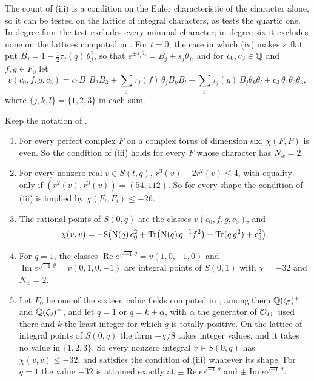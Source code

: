 The count of (iii) is a condition on the Euler
characteristic of the character alone, so it can be tested on the lattice of
integral characters, as  tests the quartic one. In
degree four the test excludes every minimal character; in degree six it
excludes none on the lattices computed in . For
$t=0$, the case in which
(iv) makes $\kappa$ flat, put
$B_{j}=1-\tfrac12\tau_{j}(q)\,\theta_{j}^{2}$, so that
$e^{\pm s_{j}\theta_{j}}=B_{j}\pm s_{j}\theta_{j}$, and for
$c_{0},c_{3}\in\mathbb{Q}$ and $f,g\in F_{0}$ let
\[
  v(c_{0},f,g,c_{3})=c_{0}B_{1}B_{2}B_{3}
  +\sum_{j}\tau_{j}(f)\,\theta_{j}B_{k}B_{l}
  +\sum_{j}\tau_{j}(g)\,B_{j}\theta_{k}\theta_{l}
  +c_{3}\,\theta_{1}\theta_{2}\theta_{3},
\]
where $\{j,k,l\}=\{1,2,3\}$ in each sum.

\begin{proposition}
\label{prop:sexticintegral}
Keep the notation of .
\begin{enumerate}[label=\textup{(\roman*)},leftmargin=2.6em,itemsep=2pt]
\item For every perfect complex $F$ on a complex torus of dimension six,
  $\chi(F,F)$ is even. So the condition of (iii)
  holds for every $F$ whose character has $N_{w}=2$.
\item For every nonzero real $v\in S(t,q)$, $r^{3}(v)-2r^{2}(v)\le4$, with
  equality only if $(r^{2}(v),r^{3}(v))=(54,112)$. So for every shape the
  condition of (iii) is implied by
  $\chi(F_{i},F_{i})\le-26$.
\item The rational points of $S(0,q)$ are the classes $v(c_{0},f,g,c_{3})$,
  and
  \[
    \chi(v,v)=-8\bigl(\mathrm{N}(q)\,c_{0}^{2}+\operatorname{Tr}\bigl(\mathrm{N}(q)\,q^{-1}f^{2}\bigr)
    +\operatorname{Tr}(q\,g^{2})+c_{3}^{2}\bigr).
  \]
\item For $q=1$, the classes $\operatorname{Re}e^{\sqrt{-1}\,\theta}=v(1,0,-1,0)$
  and $\operatorname{Im}e^{\sqrt{-1}\,\theta}=v(0,1,0,-1)$ are integral
  points of $S(0,1)$ with $\chi=-32$ and $N_{w}=2$.
\item Let $F_{0}$ be one of the sixteen cubic fields computed in \cite{BMB26}, among them $\mathbb{Q}(\zeta_{7})^{+}$ and
  $\mathbb{Q}(\zeta_{9})^{+}$, and let $q=1$ or $q=k+\alpha$, with $\alpha$ the
  generator of $\mathcal{O}_{F_{0}}$ used there and $k$ the least integer for which
  $q$ is totally positive. On the lattice of integral points of $S(0,q)$ the
  form $-\chi/8$ takes integer values, and it takes no value in
  $\{1,2,3\}$. So every nonzero integral $v\in S(0,q)$ has
  $\chi(v,v)\le-32$, and satisfies the condition of
  (iii) whatever its shape. For $q=1$ the value $-32$
  is attained exactly at $\pm\operatorname{Re}e^{\sqrt{-1}\,\theta}$ and
  $\pm\operatorname{Im}e^{\sqrt{-1}\,\theta}$.
\end{enumerate}
\end{proposition}

